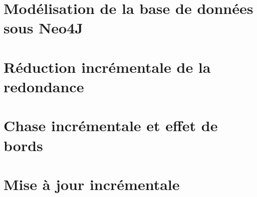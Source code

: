\section{Modélisation de la base de données sous Neo4J}


\section{Réduction incrémentale de la redondance}


\section{Chase incrémentale et effet de bords}


\section{Mise à jour incrémentale}

